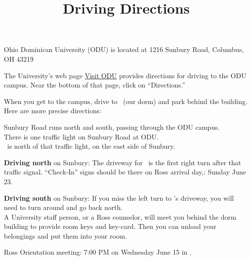 \documentclass{ross}
\title{Driving Directions}
\newcommand{\spa}{\hspace*{1cm}}
\begin{document}
\maketitle

Ohio Dominican University (ODU) is located at 1216 Sunbury Road, Columbus, OH 43219

The University's web page 
\href{https://www.ohiodominican.edu/future-students/admissions-aid/visit-odu/locations}{Visit ODU}  provides directions for driving to the ODU campus.  Near the bottom of that page, click on ``Directions.''   

When you get to the campus, drive to \dormname\ (our dorm) and park behind the building.  \\
Here are more precise directions:

\spa Sunbury Road runs north and south, passing through the ODU campus.\\
\spa There is one traffic light on Sunbury Road at ODU. \\
\spa \dormname\ is north of that traffic light, on the east side of Sunbury.
 
 {\bf Driving north} on Sunbury: The driveway for  \dormname\ is the first right turn after that traffic signal.  ``Check-In'' signs should be there on Ross arrival day,: Sunday June 23.

 {\bf Driving south} on Sunbury: If you miss the left turn to \dormname's driveway,  you will need to turn around and go back north.\\


A University staff person, or a Ross counselor, will meet you behind the dorm building to provide room keys and key-card.  Then you can unload your belongings and put them into your room. 

Ross Orientation meeting:  7:00 PM on Wednesday June 15 in \orientationlocation.
\end{document}
